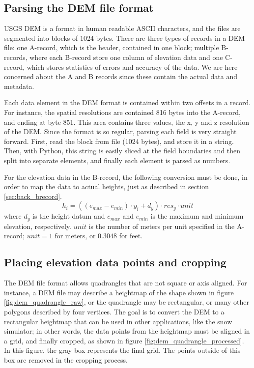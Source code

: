 \subsection{Parsing the DEM file format}
USGS DEM is a format in human readable ASCII characters, and the files are segmented into blocks of 1024 bytes. There are three types of records in a DEM file: one A-record, which is the header, contained in one block; multiple B-records, where each B-record store one column of elevation data and one C-record, which stores statistics of errors and accuracy of the data. We are here concerned about the A and B records since these contain the actual data and metadata. 

Each data element in the DEM format is contained within two offsets in a record. For instance, the spatial resolutions are contained 816 bytes into the A-record, and ending at byte 851. This area contains three values, the x, y and z resolution of the DEM. Since the format is so regular, parsing each field is very straight forward. First, read the block from file (1024 bytes), and store it in a string. Then, with Python, this string is easily sliced at the field boundaries and then split into separate elements, and finally each element is parsed as numbers.

For the elevation data in the B-record, the following conversion must be done, in order to map the data to actual heights, just as described in section \ref{sec:back_brecord}.
$$
h_i = ((e_{max}-e_{min})\cdot y_i+ d_y)\cdot res_y \cdot unit
$$
where $d_y$ is the height datum and $e_{max}$ and $e_{min}$ is the maximum and minimum elevation, respectively. $unit$ is the number of meters per unit specified in the A-record; $unit=1$ for meters, or $0.3048$ for feet.

\subsection{Placing elevation data points and cropping}
The DEM file format allows quadrangles that are not square or axis aligned. For instance, a DEM file may describe a heightmap of the shape shown in figure \ref{fig:dem_quadrangle_raw}, or the quadrangle may be rectangular, or many other polygons described by four vertices. The goal is to convert the DEM to a rectangular heightmap that can be used in other applications, like the snow simulator; in other words, the data points from the heightmap must be aligned in a grid, and finally cropped, as shown in figure \ref{fig:dem_quadrangle_processed}. In this figure, the gray box represents the final grid. The points outside of this box are removed in the cropping process.

